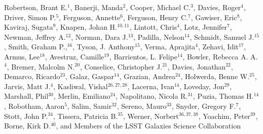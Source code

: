 Robertson, Brant E.$^{1}$, 
Banerji, Manda$^{2}$,
Cooper, Michael C.$^{3}$,
Davies, Roger$^{4}$,
Driver, Simon P.$^{5}$,
Ferguson, Annette$^{6}$,
Ferguson, Henry C.$^{7}$,
Gawiser, Eric$^{8}$,
Kaviraj, Sugata$^{9}$,
Knapen, Johan H.$^{10,11}$,
Lintott, Chris$^{4}$,
Lotz, Jennifer$^{7}$,
Newman, Jeffrey A.$^{12}$,
Norman, Dara J.$^{13}$,
Padilla, Nelson$^{14}$,
Schmidt, Samuel J.$^{15}$,
Smith, Graham P.,$^{16}$,
Tyson, J. Anthony$^{15}$,
Verma, Aprajita$^{4}$,
Zehavi, Idit$^{17}$,
Armus, Lee$^{18}$,
Avestruz, Camille$^{19}$,
Barrientos, L. Felipe$^{14}$,
Bowler, Rebecca A. A.$^{4}$,
Bremer, Malcolm N.$^{20}$,
Conselice, Christopher J.$^{21}$,
Davies, Jonathan$^{22}$,
Demarco, Ricardo$^{23}$,
Galaz, Gaspar$^{14}$,
Grazian, Andrea$^{24}$,
Holwerda, Benne W.$^{25}$,
Jarvis, Matt J.$^{4}$,
Kasliwal, Vishal$^{26,27,28}$,
Lacerna, Ivan$^{14}$,
Loveday, Jon$^{29}$,
Marshall, Phil$^{30}$,
Merlin, Emiliano$^{24}$,
Napolitano, Nicola R.$^{31}$,
Puzia, Thomas H.$^{14}$,
Robotham, Aaron$^{5}$,
Salim, Samir$^{32}$,
Sereno, Mauro$^{33}$,
Snyder, Gregory F.$^{7}$,
Stott, John P.$^{34}$,
Tissera, Patricia B.$^{35}$,
Werner, Norbert$^{36,37,38}$,
Yoachim, Peter$^{39}$,
Borne, Kirk D.$^{40}$,
and Members of the LSST Galaxies Science Collaboration 

\vspace*{5mm}

